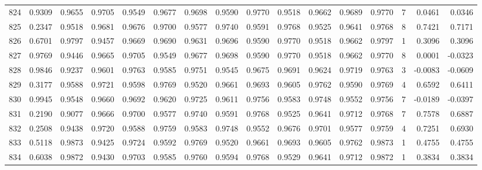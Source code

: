 \begin{tabular}{lrrrrrrrrrrrrrrr}
824 &      0.9309 &  0.9655 &  0.9705 &  0.9549 &  0.9677 &  0.9698 &  0.9590 &  0.9770 &  0.9518 &  0.9662 &   0.9689 &     0.9770 &      7 &                    0.0461 &                     0.0346 \\
825 &      0.2347 &  0.9518 &  0.9681 &  0.9676 &  0.9700 &  0.9577 &  0.9740 &  0.9591 &  0.9768 &  0.9525 &   0.9641 &     0.9768 &      8 &                    0.7421 &                     0.7171 \\
826 &      0.6701 &  0.9797 &  0.9457 &  0.9669 &  0.9690 &  0.9631 &  0.9696 &  0.9590 &  0.9770 &  0.9518 &   0.9662 &     0.9797 &      1 &                    0.3096 &                     0.3096 \\
827 &      0.9769 &  0.9446 &  0.9665 &  0.9705 &  0.9549 &  0.9677 &  0.9698 &  0.9590 &  0.9770 &  0.9518 &   0.9662 &     0.9770 &      8 &                    0.0001 &                    -0.0323 \\
828 &      0.9846 &  0.9237 &  0.9601 &  0.9763 &  0.9585 &  0.9751 &  0.9545 &  0.9675 &  0.9691 &  0.9624 &   0.9719 &     0.9763 &      3 &                   -0.0083 &                    -0.0609 \\
829 &      0.3177 &  0.9588 &  0.9721 &  0.9598 &  0.9769 &  0.9520 &  0.9661 &  0.9693 &  0.9605 &  0.9762 &   0.9590 &     0.9769 &      4 &                    0.6592 &                     0.6411 \\
830 &      0.9945 &  0.9548 &  0.9660 &  0.9692 &  0.9620 &  0.9725 &  0.9611 &  0.9756 &  0.9583 &  0.9748 &   0.9552 &     0.9756 &      7 &                   -0.0189 &                    -0.0397 \\
831 &      0.2190 &  0.9077 &  0.9666 &  0.9700 &  0.9577 &  0.9740 &  0.9591 &  0.9768 &  0.9525 &  0.9641 &   0.9712 &     0.9768 &      7 &                    0.7578 &                     0.6887 \\
832 &      0.2508 &  0.9438 &  0.9720 &  0.9588 &  0.9759 &  0.9583 &  0.9748 &  0.9552 &  0.9676 &  0.9701 &   0.9577 &     0.9759 &      4 &                    0.7251 &                     0.6930 \\
833 &      0.5118 &  0.9873 &  0.9425 &  0.9724 &  0.9592 &  0.9769 &  0.9520 &  0.9661 &  0.9693 &  0.9605 &   0.9762 &     0.9873 &      1 &                    0.4755 &                     0.4755 \\
834 &      0.6038 &  0.9872 &  0.9430 &  0.9703 &  0.9585 &  0.9760 &  0.9594 &  0.9768 &  0.9529 &  0.9641 &   0.9712 &     0.9872 &      1 &                    0.3834 &                     0.3834 \\

\end{tabular}
